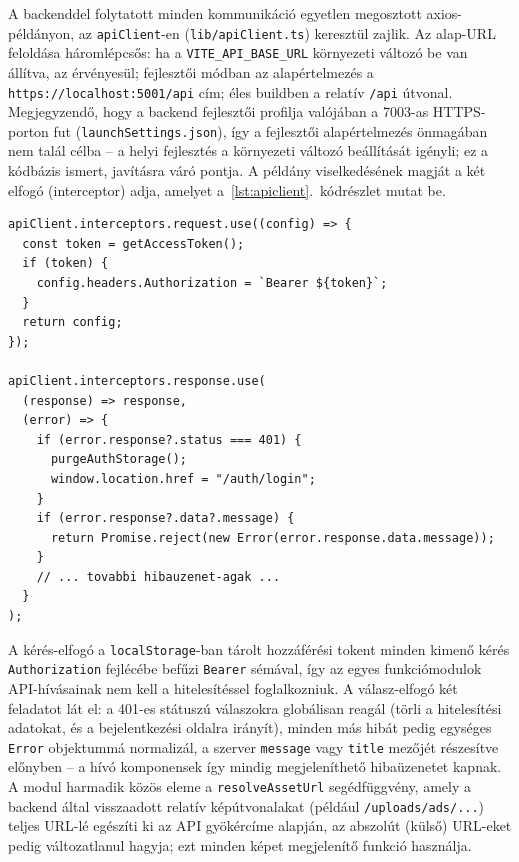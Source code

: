 A backenddel folytatott minden kommunikáció egyetlen megosztott axios-példányon, az
\texttt{apiClient}-en (\texttt{lib/apiClient.ts}) keresztül zajlik. Az alap-URL feloldása
háromlépcsős: ha a \texttt{VITE\_API\_BASE\_URL} környezeti változó be van állítva, az
érvényesül; fejlesztői módban az alapértelmezés a \texttt{https://localhost:5001/api} cím;
éles buildben a relatív \texttt{/api} útvonal. Megjegyzendő, hogy a backend fejlesztői profilja
valójában a 7003-as HTTPS-porton fut (\texttt{launchSettings.json}), így a fejlesztői
alapértelmezés önmagában nem talál célba -- a helyi fejlesztés a környezeti változó beállítását
igényli; ez a kódbázis ismert, javításra váró pontja. A példány viselkedésének magját a két
elfogó (interceptor) adja, amelyet a~\ref{lst:apiclient}.~kódrészlet mutat be.

\begin{lstlisting}[caption={Az \texttt{apiClient} kérés- és válasz-elfogója (kivonat)}, label={lst:apiclient}]
apiClient.interceptors.request.use((config) => {
  const token = getAccessToken();
  if (token) {
    config.headers.Authorization = `Bearer ${token}`;
  }
  return config;
});

apiClient.interceptors.response.use(
  (response) => response,
  (error) => {
    if (error.response?.status === 401) {
      purgeAuthStorage();
      window.location.href = "/auth/login";
    }
    if (error.response?.data?.message) {
      return Promise.reject(new Error(error.response.data.message));
    }
    // ... tovabbi hibauzenet-agak ...
  }
);
\end{lstlisting}

A kérés-elfogó a \texttt{localStorage}-ban tárolt hozzáférési tokent minden kimenő kérés
\texttt{Authorization} fejlécébe befűzi \texttt{Bearer} sémával, így az egyes funkciómodulok
API-hívásainak nem kell a hitelesítéssel foglalkozniuk. A válasz-elfogó két feladatot lát el:
a 401-es státuszú válaszokra globálisan reagál (törli a hitelesítési adatokat, és a
bejelentkezési oldalra irányít), minden más hibát pedig egységes \texttt{Error} objektummá
normalizál, a szerver \texttt{message} vagy \texttt{title} mezőjét részesítve előnyben -- a hívó
komponensek így mindig megjeleníthető hibaüzenetet kapnak. A modul harmadik közös eleme a
\texttt{resolveAssetUrl} segédfüggvény, amely a backend által visszaadott relatív képútvonalakat
(például \texttt{/uploads/ads/...}) teljes URL-lé egészíti ki az API gyökércíme alapján, az
abszolút (külső) URL-eket pedig változatlanul hagyja; ezt minden képet megjelenítő funkció
használja.


